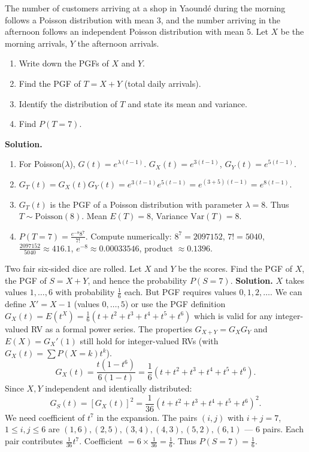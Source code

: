 \documentclass[11pt]{article}
\begin{document}
\begin{exoresolu}
The number of customers arriving at a shop in Yaoundé during the morning follows a Poisson distribution with mean $3$, and the number arriving in the afternoon follows an independent Poisson distribution with mean $5$. Let $X$ be the morning arrivals, $Y$ the afternoon arrivals.
\begin{enumerate}
\item Write down the PGFs of $X$ and $Y$.
\item Find the PGF of $T=X+Y$ (total daily arrivals).
\item Identify the distribution of $T$ and state its mean and variance.
\item Find $P(T=7)$.
\end{enumerate}
\tcblower
\textbf{Solution.}
\begin{enumerate}
\item For Poisson($\lambda$), $G(t)=e^{\lambda(t-1)}$.
$G_X(t)=e^{3(t-1)}$, $G_Y(t)=e^{5(t-1)}$.
\item $G_T(t)=G_X(t)G_Y(t)=e^{3(t-1)}e^{5(t-1)}=e^{(3+5)(t-1)}=e^{8(t-1)}$.
\item $G_T(t)$ is the PGF of a Poisson distribution with parameter $\lambda=8$. Thus $T\sim\text{Poisson}(8)$.
Mean $E(T)=8$, Variance $\text{Var}(T)=8$.
\item $P(T=7)=\frac{e^{-8}8^7}{7!}$. Compute numerically: $8^7=2097152$, $7!=5040$, $\frac{2097152}{5040}\approx416.1$, $e^{-8}\approx0.00033546$, product $\approx0.1396$.
\end{enumerate}
\end{exoresolu}

\begin{exoresolu}
Two fair six-sided dice are rolled. Let $X$ and $Y$ be the scores. Find the PGF of $X$, the PGF of $S=X+Y$, and hence the probability $P(S=7)$.
\tcblower
\textbf{Solution.}
$X$ takes values $1,\dots,6$ with probability $\frac16$ each. But PGF requires values $0,1,2,\dots$. We can define $X'=X-1$ (values $0,\dots,5$) or use the PGF definition $G_X(t)=E(t^X)=\frac{1}{6}(t+t^2+t^3+t^4+t^5+t^6)$ which is valid for any integer-valued RV as a formal power series. The properties $G_{X+Y}=G_XG_Y$ and $E(X)=G_X'(1)$ still hold for integer-valued RVs (with $G_X(t)=\sum P(X=k)t^k$).
\[
G_X(t)=\frac{t(1-t^6)}{6(1-t)} = \frac{1}{6}(t+t^2+t^3+t^4+t^5+t^6).
\]
Since $X,Y$ independent and identically distributed:
\[
G_S(t)=[G_X(t)]^2 = \frac{1}{36}(t+t^2+t^3+t^4+t^5+t^6)^2.
\]
We need coefficient of $t^7$ in the expansion. The pairs $(i,j)$ with $i+j=7$, $1\le i,j\le 6$ are $(1,6),(2,5),(3,4),(4,3),(5,2),(6,1)$ — 6 pairs.
Each pair contributes $\frac{1}{36}t^7$. Coefficient $=6\times\frac{1}{36}=\frac{1}{6}$.
Thus $P(S=7)=\frac{1}{6}$.
\end{exoresolu}
\end{document}
